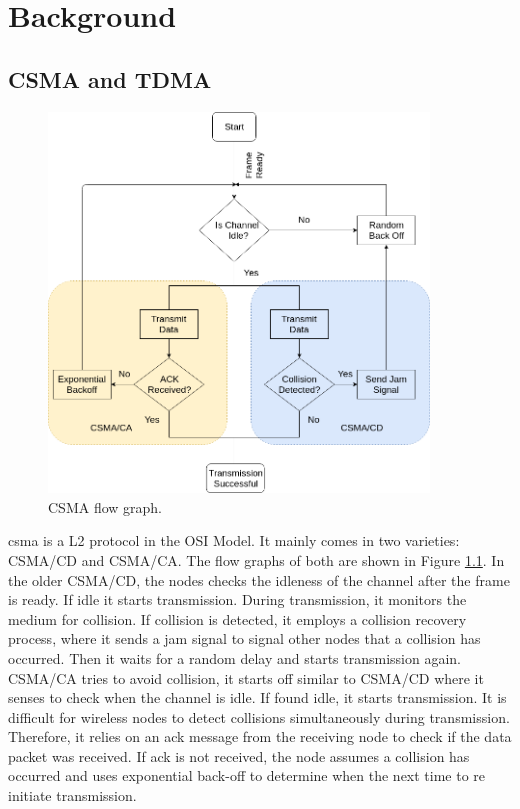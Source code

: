 \chapter{Background}

\section{CSMA and TDMA} \label{A.1}

\begin{figure}[h!]
\centering
\includegraphics[width=0.9\textwidth]{Figure/CSMA.png}
\caption{CSMA flow graph.}
\label{Csma_flow}
\end{figure}

\ac{csma} is a \ac{L2} protocol in the OSI Model. 
It mainly comes in two varieties: \ac{CSMA/CD}  and \ac{CSMA/CA}.
The flow graphs of both are shown in Figure \ref{Csma_flow}.
In the older \ac{CSMA/CD}, the nodes checks the idleness of the channel after the frame is ready.
If idle it starts transmission.
During transmission, it monitors the medium for collision.
If collision is detected, it employs a collision recovery process, where it sends a jam signal to signal other nodes that a collision has occurred.
Then it waits for a  random delay and starts transmission again.\\

\ac{CSMA/CA} tries to avoid collision, it starts off similar to \ac{CSMA/CD} where it senses to check when the channel is idle.
If found idle, it starts transmission.
It is difficult for wireless nodes to detect collisions simultaneously during transmission.
Therefore, it relies on an \ac{ack} message from the receiving node to check if the data packet was received.
If \ac{ack} is not received, the node assumes a collision has occurred and  uses exponential back-off to determine when the next time to re initiate transmission.\\


